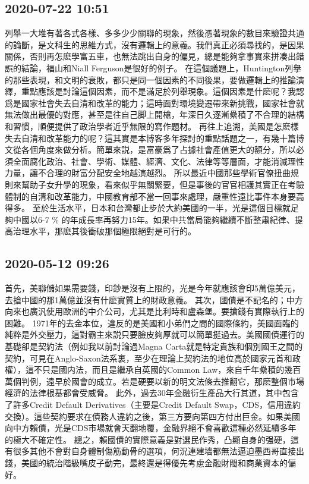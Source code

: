 \documentclass[twocolumn]{ctexart}
\begin{document}
\subsection*{2020-07-22 10:51}

列舉一大堆有著各式各樣、多多少少關聯的現象，然後憑著現象的數目來驗證共通的論斷，是文科生的思維方式，沒有邏輯上的意義。我們真正必須尋找的，是因果關係，否則再怎麽學富五車，也無法跳出自身的偏見，總是能夠拿事實來拼凑出錯誤的結論，福山和Niall Ferguson是很好的例子。
在這個議題上，Huntington列擧的那些表現，和文明的衰敗，都只是同一個因素的不同後果，要做邏輯上的推論演繹，重點應該是討論這個因素，而不是滿足於列舉現象。這個因素是什麽呢？我認爲是國家社會失去自清和改革的能力；這時面對環境變遷帶來新挑戰，國家社會就無法做出最優的對應，甚至是往自己脚上開槍，年深日久逐漸纍積了不合理的結構和習慣，順便提供了政治學者近乎無限的寫作題材。
再往上追溯，美國是怎麽樣失去自清和改革能力的呢？這其實是本博客多年探討的重點話題之一，有幾十篇博文從各個角度來做分析。簡單來説，是富豪爲了占據社會產值更大的額分，所以必須全面腐化政治、社會、學術、媒體、經濟、文化、法律等等層面，才能消滅理性力量，讓不合理的財富分配安全地越演越烈。
所以最近中國那些學術官僚扭曲規則來幫助子女升學的現象，看來似乎無關緊要，但是事後的官官相護其實正在考驗體制的自清和改革能力，中國教育部不當一回事來處理，嚴重性遠比事件本身要高得多。
至於生活水平，日本和台灣都止步於大約美國的一半，光是這個目標就足夠中國以6-7 \% 的年成長率再努力15年。如果中共當局能夠繼續不斷整肅紀律、提高治理水平，那麽其後衝破那個極限絕對是可行的。
\subsection*{2020-05-12 09:26}

首先，美聯儲如果需要錢，印鈔是沒有上限的，光是今年就應該會印5萬億美元，去搶中國的那1萬億並沒有什麽實質上的財政意義。
其次，國債是不記名的；中方向來也廣汎使用歐洲的中介公司，尤其是比利時和盧森堡。要搶錢有實際執行上的困難。
1971年的去金本位，違反的是美國和小弟們之間的國際條約，美國面臨的純粹是外交壓力，這對霸主來説只要臉皮夠厚就可以簡單挺過去。美國國債運行的基礎卻是契約法（例如我以前討論過Magna Carta就是特定貴族和個別國王之間的契約，可見在Anglo-Saxon法系裏，至少在理論上契約法的地位高於國家元首和政權），這不只是國内法，而且是繼承自英國的Common Law，來自千年纍積的幾百萬個判例，遠早於國會的成立。若是硬要以新的明文法條去推翻它，那麽整個市場經濟的法律根基都會受威脅。
此外，過去30年金融衍生產品大行其道，其中包含了許多Credit Default Derivatives（主要是Credit Default Swap，CDS，信用違約交換）。這些契約要求在債務人違約之後，第三方要向第四方付出巨金。如果美國向中方賴債，光是CDS市場就會天翻地覆，金融界絕不會喜歡這種必然延續多年的極大不確定性。
總之，賴國債的實際意義是對選民作秀，凸顯自身的强硬，這有很多其他不會對自身體制傷筋動骨的選項，何況連建墻都無法逼迫墨西哥直接出錢，美國的統治階級嘴皮子動完，最終還是得優先考慮金融財閥和商業資本的偏好。
\end{document}
